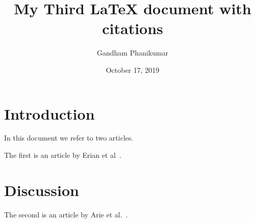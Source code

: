 \documentclass[12pt,a4paper]{article}
\author{Gandham Phanikumar}
\title{My Third LaTeX document with citations}
\begin{document}
\date{October 17, 2019}
\maketitle

\section{Introduction}

In this document we refer to two articles.

The first is an article by Erian et al~\cite{erian}.

\section{Discussion}

The second is an article by Arie et al.~\cite{arie}.



\end{document}
